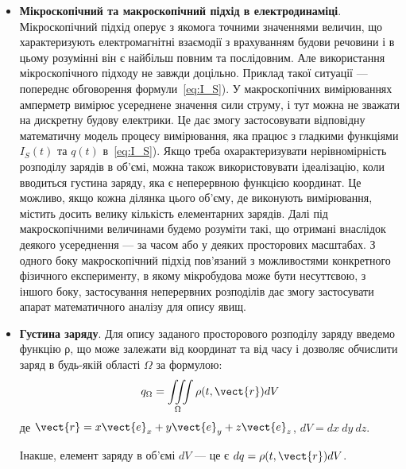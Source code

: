 \begin{itemize}
\begin{figure}
		      \caption{}
		      \label{tikz:current}
	      \end{figure}


	\item \textbf{Мікроскопічний та макроскопічний підхід в електродинаміці}. Мікроскопічний підхід оперує з якомога точними значеннями величин, що характеризують електромагнітні взаємодії з врахуванням будови речовини і в цьому розумінні він є найбільш повним та послідовним. Але використання мікроскопічного підходу не завжди доцільно. Приклад такої ситуації --- попереднє обговорення формули~\eqref{eq:I_S}). У макроскопічних вимірюваннях амперметр вимірює усереднене значення сили струму, і тут можна не зважати на дискретну будову електрики. Це дає змогу застосовувати відповідну математичну модель процесу вимірювання, яка працює з гладкими функціями $I_S(t)$ та $q(t)$ в~\eqref{eq:I_S}). Якщо треба охарактеризувати нерівномірність розподілу зарядів в об’ємі, можна також використовувати ідеалізацію, коли вводиться густина заряду, яка є неперервною функцією координат. Це можливо, якщо кожна ділянка цього об’єму, де виконують вимірювання, містить досить велику кількість елементарних зарядів. Далі під макроскопічними величинами будемо розуміти такі, що отримані внаслідок деякого усереднення --- за часом або у деяких просторових масштабах. З одного боку макроскопічний підхід пов’язаний з можливостями конкретного фізичного експерименту, в якому мікробудова може бути несуттєвою, з іншого боку, застосування неперервних розподілів дає змогу застосувати апарат математичного аналізу для опису явищ.


	\item  \textbf{Густина заряду}. Для опису заданого просторового розподілу заряду
	      введемо функцію ρ, що може залежати від координат та від часу і дозволяє
	      обчислити заряд в будь-якій області $\Omega$ за формулою:
	      \begin{equation}\label{eq:q}
		      q_{\Omega} = \iiint\limits_{\Omega} \rho(t, \vect{r}) dV
	      \end{equation}
	      де $\vect{r} = x\vect{e}_x + y\vect{e}_y + z\vect{e}_z$, $dV=dx\ dy\ dz$.

	      Інакше, елемент заряду в об’ємі $dV$ --- це є $dq = \rho(t, \vect{r}) dV$.


\end{itemize}
